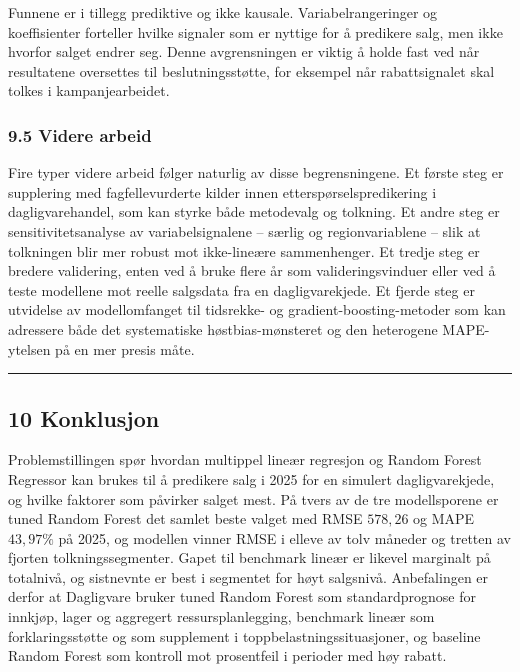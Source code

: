 \documentclass[
  11pt,
]{article}
\newcommand{\splitcode}[1]{{\ttfamily\seqsplit{#1}}}
\begin{document}
Funnene er i tillegg prediktive og ikke kausale. Variabelrangeringer og koeffisienter forteller hvilke signaler som er
nyttige for å predikere salg, men ikke hvorfor salget endrer seg. Denne avgrensningen er viktig å holde fast ved når
resultatene oversettes til beslutningsstøtte, for eksempel når rabattsignalet skal tolkes i kampanjearbeidet.

\hypertarget{videre-arbeid}{%
\subsubsection{9.5 Videre arbeid}\label{videre-arbeid}}

Fire typer videre arbeid følger naturlig av disse begrensningene. Et første steg er supplering med fagfellevurderte
kilder innen etterspørselspredikering i dagligvarehandel, som kan styrke både metodevalg og tolkning. Et andre steg er
sensitivitetsanalyse av variabelsignalene -- særlig \splitcode{Discount} og regionvariablene -- slik at tolkningen blir
mer robust mot ikke-lineære sammenhenger. Et tredje steg er bredere validering, enten ved å bruke flere år som
valideringsvinduer eller ved å teste modellene mot reelle salgsdata fra en dagligvarekjede. Et fjerde steg er utvidelse
av modellomfanget til tidsrekke- og gradient-boosting-metoder som kan adressere både det systematiske høstbias-mønsteret
og den heterogene MAPE-ytelsen på en mer presis måte.

\begin{center}\rule{0.5\linewidth}{0.5pt}\end{center}

\hypertarget{konklusjon}{%
\subsection{10 Konklusjon}\label{konklusjon}}

Problemstillingen spør hvordan multippel lineær regresjon og Random Forest Regressor kan brukes til å predikere salg i
2025 for en simulert dagligvarekjede, og hvilke faktorer som påvirker salget mest. På tvers av de tre modellsporene er
tuned Random Forest det samlet beste valget med RMSE \(578{,}26\) og MAPE \(43{,}97\%\) på 2025, og modellen vinner RMSE
i elleve av tolv måneder og tretten av fjorten tolkningssegmenter. Gapet til benchmark lineær er likevel marginalt på
totalnivå, og sistnevnte er best i segmentet for høyt salgsnivå. Anbefalingen er derfor at Dagligvare bruker tuned
Random Forest som standardprognose for innkjøp, lager og aggregert ressursplanlegging, benchmark lineær som
forklaringsstøtte og som supplement i toppbelastningssituasjoner, og baseline Random Forest som kontroll mot prosentfeil
i perioder med høy rabatt.
\end{document}
